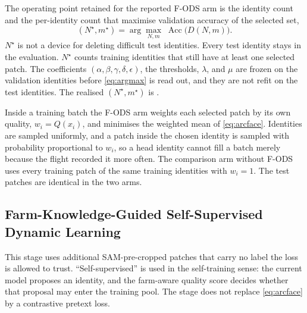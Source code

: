 The operating point retained for the reported F-ODS arm is the identity count and the per-identity count that maximise validation accuracy of the selected set,
\begin{equation}
    (N^{\star},m^{\star})
    =
    \arg\max_{N,m}\;
    \operatorname{Acc}\!\bigl(D(N,m)\bigr).
    \label{eq:argmax}
\end{equation}
$N^{\star}$ is not a device for deleting difficult test identities. Every test identity stays in the evaluation. $N^{\star}$ counts training identities that still have at least one selected patch. The coefficients $(\alpha,\beta,\gamma,\delta,\epsilon)$, the thresholds, $\lambda$, and $\mu$ are frozen on the validation identities before \eqref{eq:argmax} is read out, and they are not refit on the test identities. The realised $(N^{\star},m^{\star})$ is \pending{}.

Inside a training batch the F-ODS arm weights each selected patch by its own quality, $w_{i}=Q(x_{i})$, and minimises the weighted mean of \eqref{eq:arcface}. Identities are sampled uniformly, and a patch inside the chosen identity is sampled with probability proportional to $w_{i}$, so a head identity cannot fill a batch merely because the flight recorded it more often. The comparison arm without F-ODS uses every training patch of the same training identities with $w_{i}=1$. The test patches are identical in the two arms.

\subsection{Farm-Knowledge-Guided Self-Supervised Dynamic Learning}
\label{sec:dynamic}

This stage uses additional SAM-pre-cropped patches that carry no label the loss is allowed to trust. ``Self-supervised'' is used in the self-training sense: the current model proposes an identity, and the farm-aware quality score decides whether that proposal may enter the training pool. The stage does not replace \eqref{eq:arcface} by a contrastive pretext loss.

